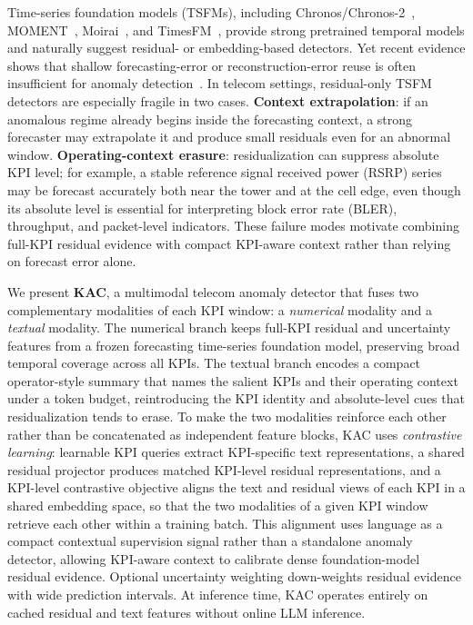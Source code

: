 \documentclass[conference]{IEEEtran}
\begin{document}
Time-series foundation models (TSFMs), including Chronos/Chronos-2~\cite{ansari2024chronos,ansari2025chronos2}, MOMENT~\cite{goswami2024moment}, Moirai~\cite{woo2024moirai}, and TimesFM~\cite{das2024timesfm}, provide strong pretrained temporal models and naturally suggest residual- or embedding-based detectors. Yet recent evidence shows that shallow forecasting-error or reconstruction-error reuse is often insufficient for anomaly detection~\cite{zhu2026oneliners}. In telecom settings, residual-only TSFM detectors are especially fragile in two cases. \textbf{Context extrapolation}: if an anomalous regime already begins inside the forecasting context, a strong forecaster may extrapolate it and produce small residuals even for an abnormal window. \textbf{Operating-context erasure}: residualization can suppress absolute KPI level; for example, a stable reference signal received power (RSRP) series may be forecast accurately both near the tower and at the cell edge, even though its absolute level is essential for interpreting block error rate (BLER), throughput, and packet-level indicators. These failure modes motivate combining full-KPI residual evidence with compact KPI-aware context rather than relying on forecast error alone.

We present \textbf{KAC}, a multimodal telecom anomaly detector that fuses two complementary modalities of each KPI window: a \emph{numerical} modality and a \emph{textual} modality. The numerical branch keeps full-KPI residual and uncertainty features from a frozen forecasting time-series foundation model, preserving broad temporal coverage across all KPIs. The textual branch encodes a compact operator-style summary that names the salient KPIs and their operating context under a token budget, reintroducing the KPI identity and absolute-level cues that residualization tends to erase. To make the two modalities reinforce each other rather than be concatenated as independent feature blocks, KAC uses \emph{contrastive learning}: learnable KPI queries extract KPI-specific text representations, a shared residual projector produces matched KPI-level residual representations, and a KPI-level contrastive objective aligns the text and residual views of each KPI in a shared embedding space, so that the two modalities of a given KPI window retrieve each other within a training batch. This alignment uses language as a compact contextual supervision signal rather than a standalone anomaly detector, allowing KPI-aware context to calibrate dense foundation-model residual evidence. Optional uncertainty weighting down-weights residual evidence with wide prediction intervals. At inference time, KAC operates entirely on cached residual and text features without online LLM inference.
\end{document}
